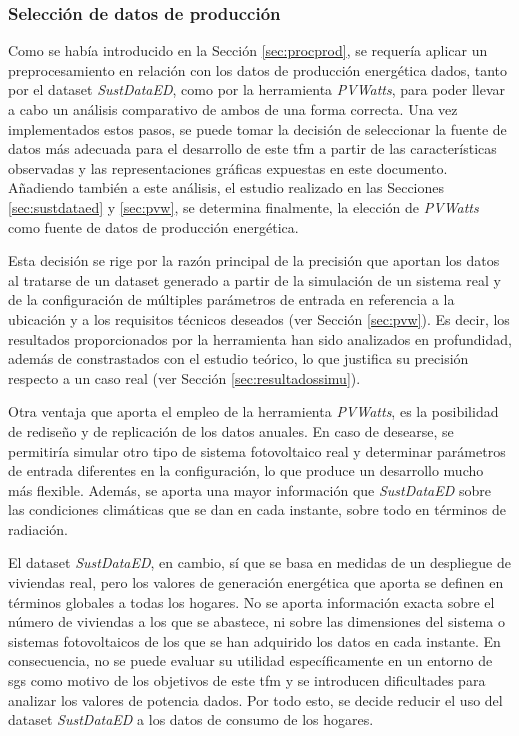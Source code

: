 \subsubsection{Selección de datos de producción}
\label{sec:select}

Como se había introducido en la Sección \ref{sec:procprod}, se requería aplicar un preprocesamiento en relación con los datos de producción energética dados, tanto por el dataset \textit{SustDataED}, como por la herramienta \textit{PVWatts}, para poder llevar a cabo un análisis comparativo de ambos de una forma correcta. Una vez implementados estos pasos, se puede tomar la decisión de seleccionar la fuente de datos más adecuada para el desarrollo de este \gls{tfm} a partir de las características observadas y las representaciones gráficas expuestas en este documento. Añadiendo también a este análisis, el estudio realizado en las Secciones \ref{sec:sustdataed} y \ref{sec:pvw}, se determina finalmente, la elección de \textit{PVWatts} como fuente de datos de producción energética. 

\vspace{3mm}

Esta decisión se rige por la razón principal de la precisión que aportan los datos al tratarse de un dataset generado a partir de la simulación de un sistema real y de la configuración de múltiples parámetros de entrada en referencia a la ubicación y a los requisitos técnicos deseados (ver Sección \ref{sec:pvw}). Es decir, los resultados proporcionados por la herramienta han sido analizados en profundidad, además de constrastados con el estudio teórico, lo que justifica su precisión respecto a un caso real (ver Sección \ref{sec:resultadossimu}).  

\vspace{3mm}

Otra ventaja que aporta el empleo de la herramienta \textit{PVWatts}, es la posibilidad de rediseño y de replicación de los datos anuales. En caso de desearse, se permitiría simular otro tipo de sistema fotovoltaico real y determinar parámetros de entrada diferentes en la configuración, lo que produce un desarrollo mucho más flexible. Además, se aporta una mayor información que \textit{SustDataED} sobre las condiciones climáticas que se dan en cada instante, sobre todo en términos de radiación.

\vspace{3mm}

El dataset \textit{SustDataED}, en cambio, sí que se basa en medidas de un despliegue de viviendas real, pero los valores de generación energética que aporta se definen en términos globales a todas los hogares. No se aporta información exacta sobre el número de viviendas a los que se abastece, ni sobre las dimensiones del sistema o sistemas fotovoltaicos de los que se han adquirido los datos en cada instante. En consecuencia, no se puede evaluar su utilidad específicamente en un entorno de \gls{sg}s como motivo de los objetivos de este \gls{tfm} y se introducen dificultades para analizar los valores de potencia dados. Por todo esto, se decide reducir el uso del dataset \textit{SustDataED} a los datos de consumo de los hogares.


